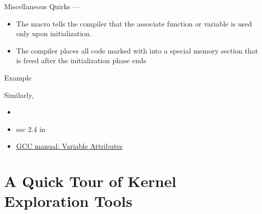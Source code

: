 \begin{frame}{Miscellaneous Quirks}{ --- }
  \begin{small}
  \end{small}
  \begin{itemize}
  \item The  macro tells the compiler that the associate function or variable
    is used only upon initialization.
  \item The compiler places all code marked with  into a special memory
    section that is freed after the initialization phase ends
  \end{itemize}
  \begin{block}{Example}
    \begin{small}
    \end{small}
  \end{block}
  Similarly,
  \begin{itemize}
    \item[] 
  \end{itemize}
\end{frame}

\begin{itemize}
\item sec 2.4 in \cite{salzman07kernel}
\item \href{http://gcc.gnu.org/onlinedocs/gcc/Variable-Attributes.html}{GCC manual:
    Variable Attributes}
\end{itemize}


\section{A Quick Tour of Kernel Exploration Tools}
\label{sec:quick-tour-kernel}

